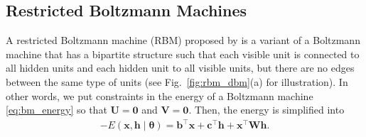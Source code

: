 \documentclass{now}
\newcommand{\vect}[1]{\mathbf{#1}}
\newcommand{\vects}[1]{\boldsymbol{#1}}
\newcommand{\matr}[1]{\mathbf{#1}}
\newcommand{\vb}[0]{\vect{b}}
\newcommand{\vc}[0]{\vect{c}}
\newcommand{\vh}[0]{\vect{h}}
\newcommand{\vx}[0]{\vect{x}}
\newcommand{\mW}[0]{\matr{W}}
\newcommand{\mU}[0]{\matr{U}}
\newcommand{\mV}[0]{\matr{V}}
\newcommand{\mzero}[0]{\matr{0}}
\newcommand{\TT}[0]{{\vects{\theta}}}
\begin{document}
\subsection{Restricted Boltzmann Machines}
\label{sec:rbm}

A restricted Boltzmann machine (RBM) proposed by
\citet{Smolensky1986} is a variant of a Boltzmann machine
that has a bipartite structure such that each visible unit
is connected to all hidden units and each hidden unit to all
visible units, but there are no edges between the same type of units
(see Fig.~\ref{fig:rbm_dbm}(a) for illustration). In other
words, we put constraints in the energy of a Boltzmann
machine \eqref{eq:bm_energy} so that $\mU = \mzero$ and $\mV =
\mzero$.  Then, the energy is simplified into 
\begin{align}
    \label{eq:rbm_energy}
    -E(\vx, \vh \mid \TT) = \vb^\top \vx + \vc^\top \vh +
    \vx^\top \mW \vh.
\end{align}
\end{document}
